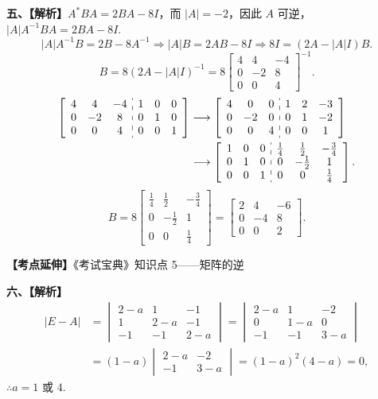 \documentclass[a4paper,11pt]{ctexart}
\begin{document}
\textbf{五、【解析】}$A^* B A = 2BA - 8I$，而 $|A| = -2$，因此 $A$ 可逆，$|A|A^{-1}BA = 2BA - 8I$.
\[
  |A|A^{-1}B = 2B - 8A^{-1} \Rightarrow |A|B = 2AB - 8I \Rightarrow 8I = (2A - |A|I)B.
\]
\[
  B = 8(2A - |A|I)^{-1} = 8 \begin{bmatrix} 4 & 4 & -4 \\ 0 & -2 & 8 \\ 0 & 0 & 4 \end{bmatrix}^{-1}.
\]
\begin{align*}
  \left[\begin{array}{ccc:ccc}
    4 & 4 & -4 & 1 & 0 & 0 \\
    0 & -2 & 8 & 0 & 1 & 0 \\
    0 & 0 & 4 & 0 & 0 & 1
  \end{array}\right]
  &\longrightarrow \left[\begin{array}{ccc:ccc}
    4 & 0 & 0 & 1 & 2 & -3 \\
    0 & -2 & 0 & 0 & 1 & -2 \\
    0 & 0 & 4 & 0 & 0 & 1
  \end{array}\right] \\
  &\longrightarrow \left[\begin{array}{ccc:ccc}
    1 & 0 & 0 & \frac{1}{4} & \frac{1}{2} & -\frac{3}{4} \\
    0 & 1 & 0 & 0 & -\frac{1}{2} & 1 \\
    0 & 0 & 1 & 0 & 0 & \frac{1}{4}
  \end{array}\right].
\end{align*}
\[
  B = 8 \begin{bmatrix}
    \frac{1}{4} & \frac{1}{2} & -\frac{3}{4} \\[0.3em]
    0 & -\frac{1}{2} & 1 \\[0.3em]
    0 & 0 & \frac{1}{4}
  \end{bmatrix}
  = \begin{bmatrix}
    2 & 4 & -6 \\
    0 & -4 & 8 \\
    0 & 0 & 2
  \end{bmatrix}.
\]

\textbf{【考点延伸】}《考试宝典》知识点 5——矩阵的逆

\vspace{0.8em}

\textbf{六、【解析】}
\begin{align*}
  |E - A| &= \begin{vmatrix}
    2 - a & 1 & -1 \\
    1 & 2 - a & -1 \\
    -1 & -1 & 2 - a
  \end{vmatrix}
  = \begin{vmatrix}
    2 - a & 1 & -2 \\
    0 & 1 - a & 0 \\
    -1 & -1 & 3 - a
  \end{vmatrix} \\
  &= (1 - a) \begin{vmatrix} 2 - a & -2 \\ -1 & 3 - a \end{vmatrix}
  = (1 - a)^2 (4 - a) = 0,
\end{align*}
$\therefore a = 1$ 或 $4$.
\end{document}
